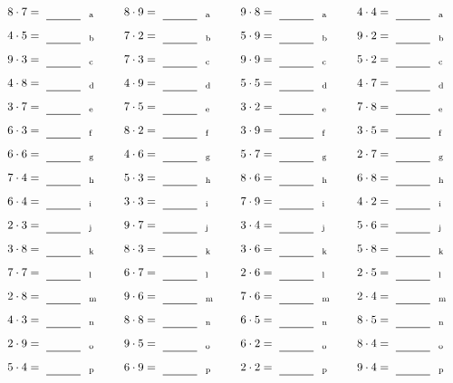 \documentclass
[
  draft    = true,
  fontsize = 11pt,
  parskip  = half-
]
{scrartcl}
\begin{document}
\par\vfill\par
\begin{align*}
    \pline{8\cdot7}&=\rline{a}
  & \pline{8\cdot9}&=\rline{a}
  & \pline{9\cdot8}&=\rline{a}
  & \pline{4\cdot4}&=\rline{a} \\[1ex]
    \pline{4\cdot5}&=\rline{b}
  & \pline{7\cdot2}&=\rline{b}
  & \pline{5\cdot9}&=\rline{b}
  & \pline{9\cdot2}&=\rline{b} \\[1ex]
    \pline{9\cdot3}&=\rline{c}
  & \pline{7\cdot3}&=\rline{c}
  & \pline{9\cdot9}&=\rline{c}
  & \pline{5\cdot2}&=\rline{c} \\[1ex]
    \pline{4\cdot8}&=\rline{d}
  & \pline{4\cdot9}&=\rline{d}
  & \pline{5\cdot5}&=\rline{d}
  & \pline{4\cdot7}&=\rline{d} \\[1ex]
    \pline{3\cdot7}&=\rline{e}
  & \pline{7\cdot5}&=\rline{e}
  & \pline{3\cdot2}&=\rline{e}
  & \pline{7\cdot8}&=\rline{e} \\[1ex]
    \pline{6\cdot3}&=\rline{f}
  & \pline{8\cdot2}&=\rline{f}
  & \pline{3\cdot9}&=\rline{f}
  & \pline{3\cdot5}&=\rline{f} \\[1ex]
    \pline{6\cdot6}&=\rline{g}
  & \pline{4\cdot6}&=\rline{g}
  & \pline{5\cdot7}&=\rline{g}
  & \pline{2\cdot7}&=\rline{g} \\[1ex]
    \pline{7\cdot4}&=\rline{h}
  & \pline{5\cdot3}&=\rline{h}
  & \pline{8\cdot6}&=\rline{h}
  & \pline{6\cdot8}&=\rline{h} \\[1ex]
    \pline{6\cdot4}&=\rline{i}
  & \pline{3\cdot3}&=\rline{i}
  & \pline{7\cdot9}&=\rline{i}
  & \pline{4\cdot2}&=\rline{i} \\[1ex]
    \pline{2\cdot3}&=\rline{j}
  & \pline{9\cdot7}&=\rline{j}
  & \pline{3\cdot4}&=\rline{j}
  & \pline{5\cdot6}&=\rline{j} \\[1ex]
    \pline{3\cdot8}&=\rline{k}
  & \pline{8\cdot3}&=\rline{k}
  & \pline{3\cdot6}&=\rline{k}
  & \pline{5\cdot8}&=\rline{k} \\[1ex]
    \pline{7\cdot7}&=\rline{l}
  & \pline{6\cdot7}&=\rline{l}
  & \pline{2\cdot6}&=\rline{l}
  & \pline{2\cdot5}&=\rline{l} \\[1ex]
    \pline{2\cdot8}&=\rline{m}
  & \pline{9\cdot6}&=\rline{m}
  & \pline{7\cdot6}&=\rline{m}
  & \pline{2\cdot4}&=\rline{m} \\[1ex]
    \pline{4\cdot3}&=\rline{n}
  & \pline{8\cdot8}&=\rline{n}
  & \pline{6\cdot5}&=\rline{n}
  & \pline{8\cdot5}&=\rline{n} \\[1ex]
    \pline{2\cdot9}&=\rline{o}
  & \pline{9\cdot5}&=\rline{o}
  & \pline{6\cdot2}&=\rline{o}
  & \pline{8\cdot4}&=\rline{o} \\[1ex]
    \pline{5\cdot4}&=\rline{p}
  & \pline{6\cdot9}&=\rline{p}
  & \pline{2\cdot2}&=\rline{p}
  & \pline{9\cdot4}&=\rline{p}
\end{align*}
\end{document}
